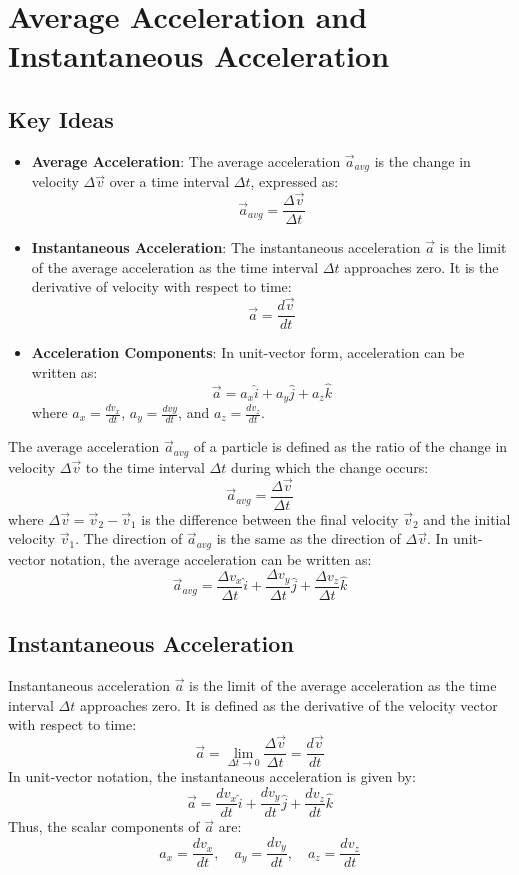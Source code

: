 \documentclass{article}
\begin{document}
\section*{Average Acceleration and Instantaneous Acceleration}
\subsection*{Key Ideas}
\begin{itemize}
    \item \textbf{Average Acceleration}: The average acceleration $\vec{a}_{avg}$ is the change in velocity $\Delta \vec{v}$ over a time interval $\Delta t$, expressed as:
    \[
    \vec{a}_{avg} = \frac{\Delta \vec{v}}{\Delta t}
    \]
    \item \textbf{Instantaneous Acceleration}: The instantaneous acceleration $\vec{a}$ is the limit of the average acceleration as the time interval $\Delta t$ approaches zero. It is the derivative of velocity with respect to time:
    \[
    \vec{a} = \frac{d\vec{v}}{dt}
    \]
    \item \textbf{Acceleration Components}: In unit-vector form, acceleration can be written as:
    \[
    \vec{a} = a_x \hat{i} + a_y \hat{j} + a_z \hat{k}
    \]
    where $a_x = \frac{dv_x}{dt}$, $a_y = \frac{dvy}{dt}$, and $a_z = \frac{dv_z}{dt}$.
\end{itemize}
The average acceleration $\vec{a}_{avg}$ of a particle is defined as the ratio of the change in velocity $\Delta \vec{v}$ to the time interval $\Delta t$ during which the change occurs:
\[
\vec{a}_{avg} = \frac{\Delta \vec{v}}{\Delta t}
\]
where $\Delta \vec{v} = \vec{v}_2 - \vec{v}_1$ is the difference between the final velocity $\vec{v}_2$ and the initial velocity $\vec{v}_1$. The direction of $\vec{a}_{avg}$ is the same as the direction of $\Delta \vec{v}$.
In unit-vector notation, the average acceleration can be written as:
\[
\vec{a}_{avg} = \frac{\Delta v_x}{\Delta t} \hat{i} + \frac{\Delta v_y}{\Delta t} \hat{j} + \frac{\Delta v_z}{\Delta t} \hat{k}
\]

\subsection*{Instantaneous Acceleration}
Instantaneous acceleration $\vec{a}$ is the limit of the average acceleration as the time interval $\Delta t$ approaches zero. It is defined as the derivative of the velocity vector with respect to time:
\[
\vec{a} = \lim_{\Delta t \to 0} \frac{\Delta \vec{v}}{\Delta t} = \frac{d\vec{v}}{dt}
\]
In unit-vector notation, the instantaneous acceleration is given by:
\[
\vec{a} = \frac{dv_x}{dt} \hat{i} + \frac{dv_y}{dt} \hat{j} + \frac{dv_z}{dt} \hat{k}
\]
Thus, the scalar components of $\vec{a}$ are:
\[
a_x = \frac{dv_x}{dt}, \quad a_y = \frac{dv_y}{dt}, \quad a_z = \frac{dv_z}{dt}
\]
\end{document}
